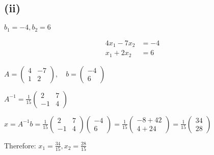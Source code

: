 \subsection*{(ii)} $b_1 = -4, b_2 = 6$

\begin{align}
	4x_1 - 7x_2 & = -4 \\
	x_1 + 2x_2  & = 6
\end{align}

$A = \begin{pmatrix}
	4 & -7 \\
	1 & 2
\end{pmatrix}, \quad b = \begin{pmatrix}
	-4 \\
	6
\end{pmatrix}$

$A^{-1} = \frac{1}{15}\begin{pmatrix}
	2 & 7 \\
	-1 & 4
\end{pmatrix}$

$x = A^{-1}b = \frac{1}{15}\begin{pmatrix}
	2 & 7 \\
	-1 & 4
\end{pmatrix}\begin{pmatrix}
	-4 \\
	6
\end{pmatrix} = \frac{1}{15}\begin{pmatrix}
	-8 + 42 \\
	4 + 24
\end{pmatrix} = \frac{1}{15}\begin{pmatrix}
	34 \\
	28
\end{pmatrix}$

Therefore: $x_1 = \frac{34}{15}, x_2 = \frac{28}{15}$